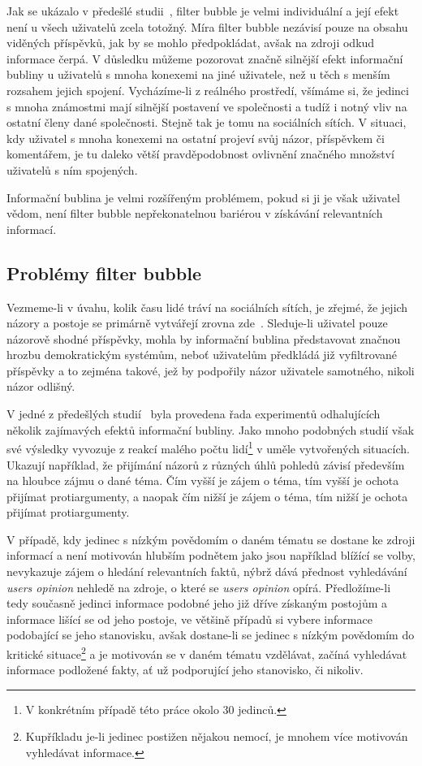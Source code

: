 \documentclass[12pt, a4paper]{article}
\numberwithin{equation}{section} 	%
\begin{document}
Jak se ukázalo v předešlé studii~\cite{TheImpactOfFilterBubble}, filter bubble je velmi individuální a její efekt není u všech uživatelů zcela totožný. Míra filter bubble nezávisí pouze na obsahu viděných příspěvků, jak by se mohlo předpokládat, avšak na zdroji odkud informace čerpá. V důsledku můžeme pozorovat značně silnější efekt informační bubliny u uživatelů s mnoha konexemi na jiné uživatele, než u těch s menším rozsahem jejich spojení. Vycházíme-li z reálného prostředí, všímáme si, že jedinci s mnoha známostmi mají silnější postavení ve společnosti a tudíž i notný vliv na ostatní členy dané společnosti. Stejně tak je tomu na sociálních sítích. V situaci, kdy uživatel s mnoha konexemi na ostatní projeví svůj názor, příspěvkem či komentářem, je tu daleko větší pravděpodobnost ovlivnění značného množství uživatelů s ním spojených.

Informační bublina je velmi rozšířeným problémem, pokud si ji je však uživatel vědom, není filter bubble nepřekonatelnou bariérou v získávání relevantních informací.


\subsection{Problémy filter bubble}
Vezmeme-li v úvahu, kolik času lidé tráví na sociálních sítích, je zřejmé, že jejich názory a postoje se primárně vytvářejí zrovna zde~\cite{TheImpactOfFilterBubble, BeyondFilterBubble, whyNewsOnTwitter}. Sleduje-li uživatel pouze názorově shodné příspěvky, mohla by informační bublina před\-sta\-vo\-vat značnou hrozbu demokratickým systémům, neboť uživatelům předkládá již vyfiltrované příspěvky a to zejména takové, jež by podpořily názor uživatele samotného, nikoli názor odlišný.

V jedné z předešlých studií~\cite{BeyondFilterBubble} byla provedena řada experimentů odhalujících několik zajímavých efektů informační bubliny. Jako mnoho podobných studií však své výsledky vyvozuje z reakcí malého počtu lidí\footnote{V konkrétním případě této práce okolo 30 jedinců.} v uměle vytvořených situacích. Ukazují například, že přijímání názorů z různých úhlů pohledů závisí především na hloubce zájmu o dané téma. Čím vyšší je zájem o téma, tím vyšší je ochota přijímat protiargumenty, a naopak čím nižší je zájem o téma, tím nižší je ochota přijímat protiargumenty.

V případě, kdy jedinec s nízkým povědomím o daném tématu se dostane ke zdroji informací a není motivován hlubším podnětem jako jsou například blížící se volby, nevykazuje zájem o hledání relevantních faktů, nýbrž dává přednost vyhledávání \textit{users opinion} nehledě na zdroje, o které se \textit{users opinion} opírá. Předložíme-li tedy současně jedinci informace podobné jeho již dříve získaným postojům a informace lišící se od jeho postoje, ve většině případů si vybere informace podobající se jeho stanovisku, avšak dostane-li se jedinec s nízkým povědomím do kritické situace\footnote{Kupříkladu je-li jedinec postižen nějakou nemocí, je mnohem více motivován vyhledávat informace.} a je motivován se v daném tématu vzdělávat, začíná vyhledávat informace podložené fakty, ať už podporující jeho stanovisko, či nikoliv.
\end{document}
